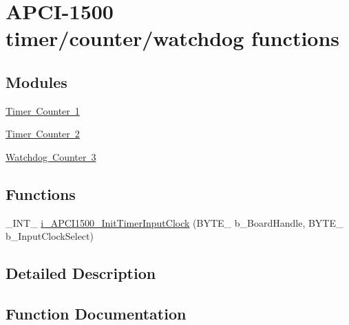 \hypertarget{group___timer_cmp_d_l_l}{}\section{A\+P\+C\+I-\/1500 timer/counter/watchdog functions}
\label{group___timer_cmp_d_l_l}
\subsection*{Modules}
\begin{DoxyCompactItemize}
\item 
\mbox{\hyperlink{group___timer1_cmp_d_l_l}{Timer Counter 1}}
\item 
\mbox{\hyperlink{group___timer2_cmp_d_l_l}{Timer Counter 2}}
\item 
\mbox{\hyperlink{group___timer3_cmp_d_l_l}{Watchdog Counter 3}}
\end{DoxyCompactItemize}
\subsection*{Functions}
\begin{DoxyCompactItemize}
\item 
\+\_\+\+I\+N\+T\+\_\+ \mbox{\hyperlink{group___timer_cmp_d_l_l_gaf6371afb6197977e2bd018280519bbca}{i\+\_\+\+A\+P\+C\+I1500\+\_\+\+Init\+Timer\+Input\+Clock}} (B\+Y\+T\+E\+\_\+ b\+\_\+\+Board\+Handle, B\+Y\+T\+E\+\_\+ b\+\_\+\+Input\+Clock\+Select)
\end{DoxyCompactItemize}


\subsection{Detailed Description}


\subsection{Function Documentation}
\mbox{\label{group___timer_cmp_d_l_l_gaf6371afb6197977e2bd018280519bbca}} 
